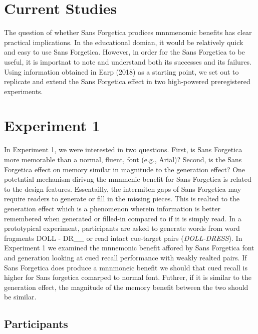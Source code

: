 \documentclass[pdf]{apa6}
\begin{document}
\hypertarget{current-studies}{%
\section{Current Studies}\label{current-studies}}

The question of whether Sans Forgetica prodices mnnmenomic benefits has clear practical implications. In the educational domian, it would be relatively quick and easy to use Sans Forgetica. However, in order for the Sans Forgetica to be useful, it is importnat to note and understand both its successes and its failures. Using information obtained in Earp (2018) as a starting point, we set out to replicate and extend the Sans Forgetica effect in two high-powered preregistered experiments.

\hypertarget{experiment-1}{%
\section{Experiment 1}\label{experiment-1}}

In Experiment 1, we were interested in two questions. First, is Sans Forgetica more memorable than a normal, fluent, font (e.g., Arial)? Second, is the Sans Forgetica effect on memory similar in magnitude to the generation effect? One potetntial mechanism dirivng the mnnmenic benefit for Sans Forgetica is related to the design features. Essentailly, the intermiten gaps of Sans Forgetica may require readers to generate or fill in the missing pieces. This is realted to the generation effect which is a phenomenon wherein information is better remembered when generated or filled-in compared to if it is simply read. In a prototypical experiment, participants are asked to generate words from word fragments DOLL - DR\_\_ or read intact cue-target pairs (\emph{DOLL-DRESS}). In Experiment 1 we examined the mnnemonic benefit affored by Sans Forgetica font and generation looking at cued recall performance with weakly realted pairs. If Sans Forgetica does produce a mnnmoneic benefit we should that cued recall is higher for Sans forgetica comarped to normal font. Futhrer, if it is similar to the generation effect, the magnitude of the memory benefit between the two should be similar.

\hypertarget{participants}{%
\subsection{Participants}\label{participants}}
\end{document}
